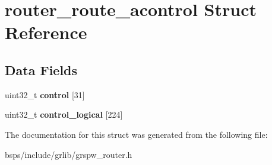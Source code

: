 \hypertarget{structrouter__route__acontrol}{}\section{router\+\_\+route\+\_\+acontrol Struct Reference}
\label{structrouter__route__acontrol}
\subsection*{Data Fields}
\begin{DoxyCompactItemize}
\item 
\mbox{\label{structrouter__route__acontrol_af9b321d7131f7dbfcbd9f7b44d53f52e}} 
uint32\+\_\+t {\bfseries control} \mbox{[}31\mbox{]}
\item 
\mbox{\label{structrouter__route__acontrol_a8c8f15cd2303b7e60f7e339a2bb7a992}} 
uint32\+\_\+t {\bfseries control\+\_\+logical} \mbox{[}224\mbox{]}
\end{DoxyCompactItemize}


The documentation for this struct was generated from the following file\+:\begin{DoxyCompactItemize}
\item 
bsps/include/grlib/grspw\+\_\+router.\+h\end{DoxyCompactItemize}

